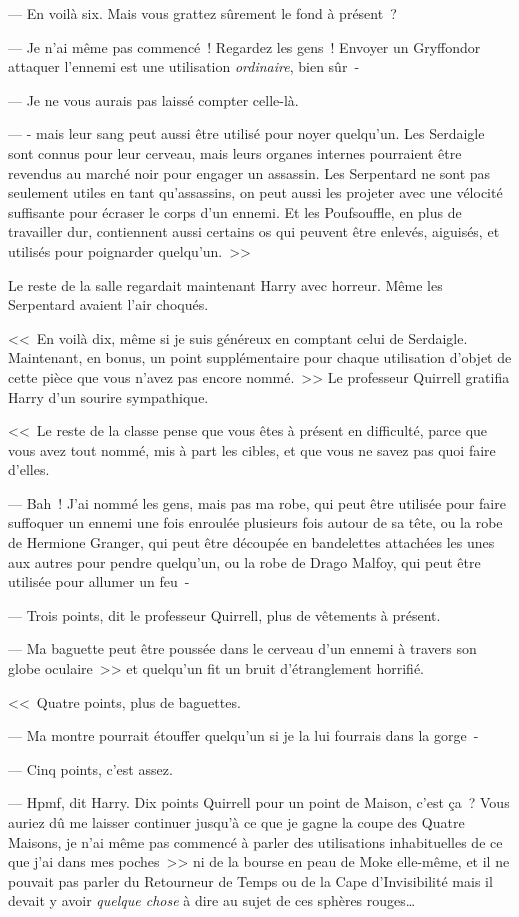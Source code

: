 --- En voilà six. Mais vous grattez sûrement le fond à présent~?

--- Je n'ai même pas commencé~! Regardez les gens~! Envoyer un Gryffondor attaquer l'ennemi est une utilisation \emph{ordinaire}, bien sûr~-

--- Je ne vous aurais pas laissé compter celle-là.

--- - mais leur sang peut aussi être utilisé pour noyer quelqu'un. Les Serdaigle sont connus pour leur cerveau, mais leurs organes internes pourraient être revendus au marché noir pour engager un assassin. Les Serpentard ne sont pas seulement utiles en tant qu'assassins, on peut aussi les projeter avec une vélocité suffisante pour écraser le corps d'un ennemi. Et les Poufsouffle, en plus de travailler dur, contiennent aussi certains os qui peuvent être enlevés, aiguisés, et utilisés pour poignarder quelqu'un.~>>

Le reste de la salle regardait maintenant Harry avec horreur. Même les Serpentard avaient l'air choqués.

<<~En voilà dix, même si je suis généreux en comptant celui de Serdaigle. Maintenant, en bonus, un point supplémentaire pour chaque utilisation d'objet de cette pièce que vous n'avez pas encore nommé.~>> Le professeur Quirrell gratifia Harry d'un sourire sympathique.

<<~Le reste de la classe pense que vous êtes à présent en difficulté, parce que vous avez tout nommé, mis à part les cibles, et que vous ne savez pas quoi faire d'elles.

--- Bah~! J'ai nommé les gens, mais pas ma robe, qui peut être utilisée pour faire suffoquer un ennemi une fois enroulée plusieurs fois autour de sa tête, ou la robe de Hermione Granger, qui peut être découpée en bandelettes attachées les unes aux autres pour pendre quelqu'un, ou la robe de Drago Malfoy, qui peut être utilisée pour allumer un feu~-

--- Trois points, dit le professeur Quirrell, plus de vêtements à présent.

--- Ma baguette peut être poussée dans le cerveau d'un ennemi à travers son globe oculaire~>> et quelqu'un fit un bruit d'étranglement horrifié.

<<~Quatre points, plus de baguettes.

--- Ma montre pourrait étouffer quelqu'un si je la lui fourrais dans la gorge~-

--- Cinq points, c'est assez.

--- Hpmf, dit Harry. Dix points Quirrell pour un point de Maison, c'est ça~? Vous auriez dû me laisser continuer jusqu'à ce que je gagne la coupe des Quatre Maisons, je n'ai même pas commencé à parler des utilisations inhabituelles de ce que j'ai dans mes poches~>> ni de la bourse en peau de Moke elle-même, et il ne pouvait pas parler du Retourneur de Temps ou de la Cape d'Invisibilité mais il devait y avoir \emph{quelque chose} à dire au sujet de ces sphères rouges…

